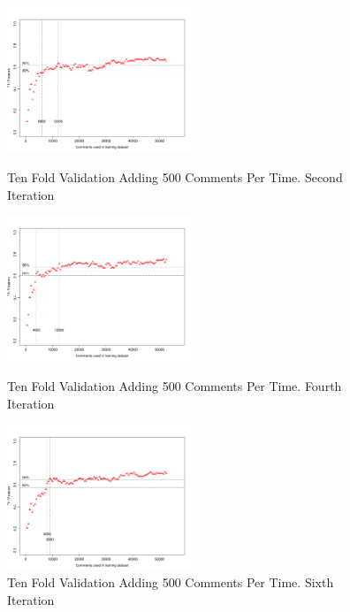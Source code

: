 \begin{figure}[thb!]
  \centering
  \vspace{-14mm}
  \includegraphics[width=0.49\textwidth]{figures/appendix/ten_fold_validation_requirement/ten_fold_validation_1_500.pdf}
  \vspace{-5mm}
  \caption{Ten Fold Validation Adding 500 Comments Per Time. Second Iteration}
  \label{fig:requirement_ten_fold_validation_1_100}
  \includegraphics[width=0.49\textwidth]{figures/appendix/ten_fold_validation_requirement/ten_fold_validation_3_500.pdf}
  \vspace{-5mm}
  \caption{Ten Fold Validation Adding 500 Comments Per Time. Fourth Iteration}
  \label{fig:requirement_ten_fold_validation_3_100}
  \includegraphics[width=0.49\textwidth]{figures/appendix/ten_fold_validation_requirement/ten_fold_validation_5_500.pdf}
  \vspace{-5mm}
  \caption{Ten Fold Validation Adding 500 Comments Per Time. Sixth Iteration}
  \label{fig:requirement_ten_fold_validation_5_100}
\end{figure}

